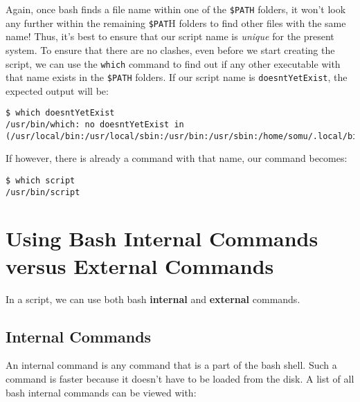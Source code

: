 Again, once bash finds a file name within one of the \verb|$PATH| folders, it won't look any further within the remaining \verb|$PAT|H folders to find other files with the same name! Thus, it's best to ensure that our script name is \textit{unique} for the present system. To ensure that there are no clashes, even before we start creating the script, we can use the \verb|which| command to find out if any other executable with that name exists in the \verb|$PATH| folders. If our script name is \verb|doesntYetExist|, the expected output will be:

\vspace{-15pt}
\begin{verbatim}
$ which doesntYetExist
/usr/bin/which: no doesntYetExist in (/usr/local/bin:/usr/local/sbin:/usr/bin:/usr/sbin:/home/somu/.local/bin:/home/somu/bin)
\end{verbatim}
\vspace{-10pt}	

\noindent
If however, there is already a command with that name, our command becomes:

\vspace{-15pt}
\begin{verbatim}
$ which script
/usr/bin/script
\end{verbatim}
\vspace{-10pt}	

\section{Using Bash Internal Commands versus External Commands}
In a script, we can use both bash \textbf{internal}	and \textbf{external} commands.

\vspace{-10pt}
\subsection{Internal Commands}
An internal command is any command that is a part of the bash shell. Such a command is faster because it doesn't have to be loaded from the disk. A list of all bash internal commands can be viewed with:

